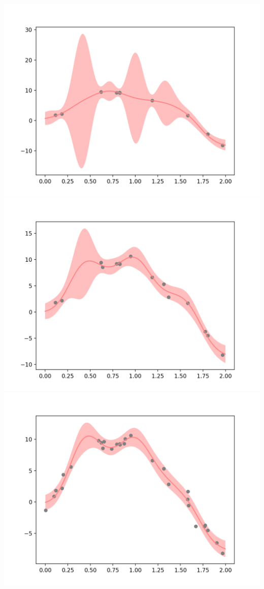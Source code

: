 \documentclass{article}
\begin{document}
\includegraphics[width=\textwidth]{10sample_predict.png}\\
\includegraphics[width=\textwidth]{15sample_predict.png}\\
\includegraphics[width=\textwidth]{30sample_predict.png}\\
\end{document}

